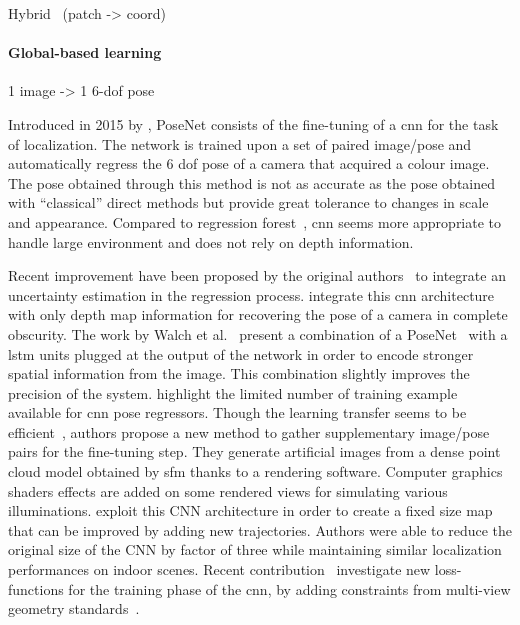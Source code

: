 Hybrid~\citep{Duong2018} (patch -> coord)

\paragraph{Global-based learning}
\label{para:cnn_regressor}

1 image -> 1 6-\ac{dof} pose

Introduced in 2015 by \citet{Kendall2015}, PoseNet consists of the fine-tuning of a \ac{cnn} for the task of localization. The network is trained upon a set of paired image/pose and automatically regress the 6 \ac{dof} pose of a camera that acquired a colour image. The pose obtained through this method is not as accurate as the pose obtained with ``classical'' direct methods \citep{Feng2016a,Sattler2016a} but provide great tolerance to changes in scale and appearance. Compared to regression forest~\citep{Valentin2015}, \ac{cnn} seems more appropriate to handle large environment and does not rely on depth information.

Recent improvement have been proposed by the original authors~\citep{Kendall2016} to integrate an uncertainty estimation in the regression process. \citet{Liu2016} integrate this \ac{cnn} architecture with only depth map information for recovering the pose of a camera in complete obscurity. The work by Walch et al.~\citep{Walch2016mastersThesis,Walch2016a} present a combination of a PoseNet~\citep{Kendall2015} with a \ac{lstm} units plugged at the output of the network in order to encode stronger spatial information from the image. This combination slightly improves the precision of the system. \citet{Jia2016} highlight the limited number of training example available for \ac{cnn} pose regressors. Though the learning transfer seems to be efficient~\citep{Kendall2015}, authors propose a new method to gather supplementary image/pose pairs for the fine-tuning step. They generate artificial images from a dense point cloud model obtained by \ac{sfm} thanks to a rendering software. Computer graphics shaders effects are added on some rendered views for simulating various illuminations. \citet{Contreras2017} exploit this CNN architecture in order to create a fixed size map that can be improved by adding new trajectories. Authors were able to reduce the original size of the CNN by factor of three while maintaining similar localization performances on indoor scenes. Recent contribution~\citep{Kendall2017} investigate new loss-functions for the training phase of the \ac{cnn}, by adding constraints from multi-view geometry standards~\citep{Hartley2003}.

